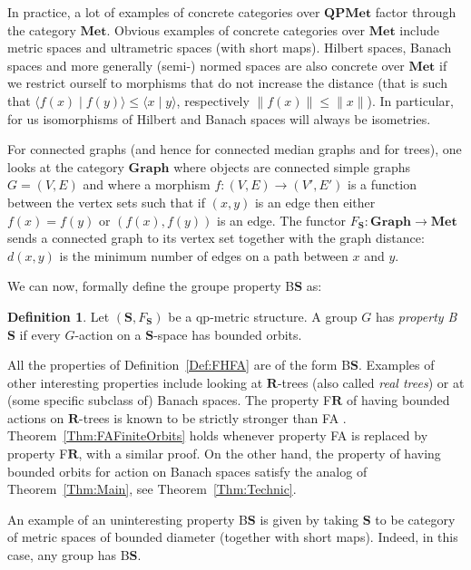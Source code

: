 \documentclass[a4paper]{article}
\theoremstyle{definition}
\newtheorem{defn}[lem]{Definition}
\newcommand*{\BS}{B$\mathbf{S}$}
\begin{document}
In practice, a lot of examples of concrete categories over $\mathbf{QPMet}$ factor through the category $\mathbf{Met}$.
Obvious examples of concrete categories over $\mathbf{Met}$ include metric spaces and ultrametric spaces (with short maps).
Hilbert spaces, Banach spaces and more generally (semi-) normed spaces are also concrete over $\mathbf{Met}$ if we restrict ourself to morphisms that do not increase the distance (that is such that $\langle f(x)\mid f(y)\rangle\leq\langle x\mid y\rangle$, respectively $\|f(x)\|\leq\| x\|$). In particular, for us isomorphisms of Hilbert and Banach spaces will always be isometries.
 
For connected graphs (and hence for connected median graphs and for trees), one looks at the category $\mathbf{Graph}$ where objects are connected simple graphs $G=(V,E)$ and where a morphism $f\colon (V,E)\to(V',E')$ is a function between the vertex sets such that if $(x,y)$ is an edge then either $f(x)=f(y)$ or $(f(x),f(y))$ is an edge.
The functor $F_{\mathbf S}\colon\mathbf{Graph}\to\mathbf{Met}$ sends a connected graph to its vertex set together with the graph distance: $d(x,y)$ is the minimum number of edges on a path between $x$ and $y$.

We can now, formally define the groupe property \BS{} as:
%
\begin{defn}\label{Def:PropBS}
Let $(\mathbf S,F_{\mathbf S})$ be a qp-metric structure.
A group $G$ has \emph{property \BS} if every $G$-action on a $\mathbf S$-space has bounded orbits.
\end{defn}
%
%
All the properties of Definition~\ref{Def:FHFA} are of the form \BS.
Examples of other interesting properties include looking at $\mathbf{R}$-trees (also called \emph{real trees}) or at (some specific subclass of) Banach spaces.
The property F$\mathbf{R}$ of having bounded actions on $\mathbf{R}$-trees is known to be strictly stronger than FA \cite{MR3465847}. Theorem~\ref{Thm:FAFiniteOrbits} holds whenever property FA is replaced by property F$\mathbf{R}$, with a similar proof.
On the other hand, the property of having bounded orbits for action on Banach spaces satisfy the analog of Theorem~\ref{Thm:Main}, see Theorem~\ref{Thm:Technic}.

An example of an uninteresting property \BS{} is given by taking $\mathbf{S}$ to be category of metric spaces of bounded diameter (together with short maps). Indeed, in this case, any group has \BS.
\end{document}
